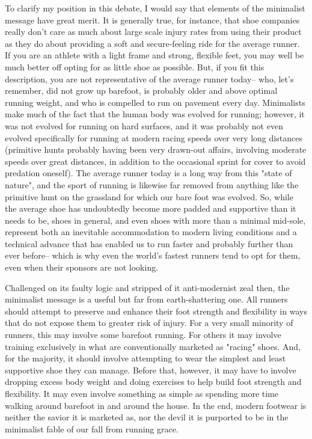 To clarify my position in this debate, I would say that elements of the minimalist message have great merit. It is generally true, for instance, that shoe companies really don't care as much about large scale injury rates from using their product as they do about providing a soft and secure-feeling ride for the average runner. If you are an athlete with a light frame and strong, flexible feet, you may well be much better off opting for as little shoe as possible. But, if you fit this description, you are not representative of the average runner today-- who, let's remember, did not grow up barefoot, is probably older and above optimal running weight, and who is compelled to run on pavement every day. Minimalists make much of the fact that the human body was evolved for running; however, it was not evolved for running on hard surfaces, and it was probably not even evolved specifically for running at modern racing speeds over very long distances (primitive hunts probably having been very drawn-out affairs, involving moderate speeds over great distances, in addition to the occasional sprint for cover to avoid predation oneself). The average runner today is a long way from this "state of nature", and the sport of running is likewise far removed from anything like the primitive hunt on the grassland for which our bare foot was evolved. So, while the average shoe has undoubtedly become more padded and supportive than it needs to be, shoes in general, and even shoes with more than a minimal mid-sole, represent both an inevitable accommodation to modern living conditions and a technical advance that has enabled us to run faster and probably further than ever before-- which is why even the world's fastest runners tend to opt for them, even when their sponsors are not looking.

Challenged on its faulty logic and stripped of it anti-modernist zeal then, the minimalist message is a useful but far from earth-shattering one. All runners should attempt to preserve and enhance their foot strength and flexibility in ways that do not expose them to greater risk of injury. For a very small minority of runners, this may involve some barefoot running. For others it may involve training exclusively in what are conventionally marketed as "racing" shoes. And, for the majority, it should involve attempting to wear the simplest and least supportive shoe they can manage. Before that, however, it may have to involve dropping excess body weight and doing exercises to help build foot strength and flexibility. It may even involve something as simple as spending more time walking around barefoot in and around the house. In the end, modern footwear is neither the savior it is marketed as, nor the devil it is purported to be in the minimalist fable of our fall from running grace.




